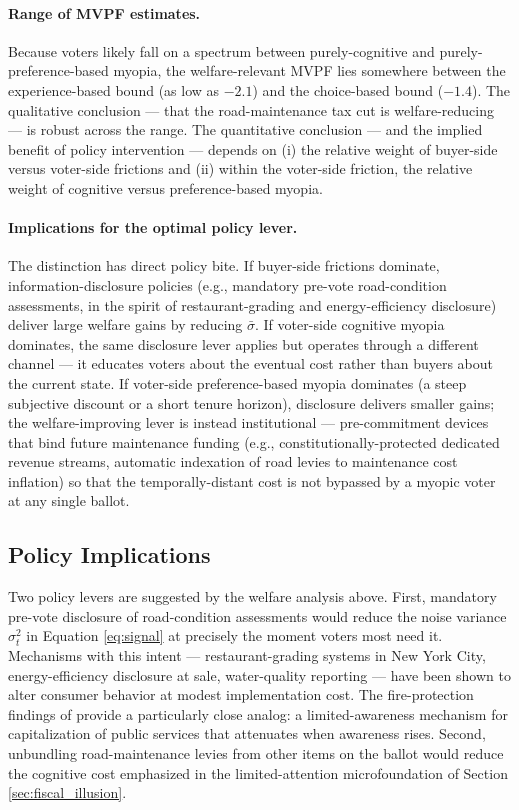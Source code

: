 \paragraph{Range of MVPF estimates.}
Because voters likely fall on a spectrum between purely-cognitive and purely-preference-based myopia, the welfare-relevant MVPF lies somewhere between the experience-based bound (as low as $-2.1$) and the choice-based bound ($-1.4$). The qualitative conclusion --- that the road-maintenance tax cut is welfare-reducing --- is robust across the range. The quantitative conclusion --- and the implied benefit of policy intervention --- depends on (i) the relative weight of buyer-side versus voter-side frictions and (ii) within the voter-side friction, the relative weight of cognitive versus preference-based myopia.

\paragraph{Implications for the optimal policy lever.}
The distinction has direct policy bite. If buyer-side frictions dominate, information-disclosure policies (e.g., mandatory pre-vote road-condition assessments, in the spirit of restaurant-grading and energy-efficiency disclosure) deliver large welfare gains by reducing $\bar{\sigma}$. If voter-side cognitive myopia dominates, the same disclosure lever applies but operates through a different channel --- it educates voters about the eventual cost rather than buyers about the current state. If voter-side preference-based myopia dominates (a steep subjective discount or a short tenure horizon), disclosure delivers smaller gains; the welfare-improving lever is instead institutional --- pre-commitment devices that bind future maintenance funding (e.g., constitutionally-protected dedicated revenue streams, automatic indexation of road levies to maintenance cost inflation) so that the temporally-distant cost is not bypassed by a myopic voter at any single ballot.

\subsection{Policy Implications}

Two policy levers are suggested by the welfare analysis above. First, mandatory pre-vote disclosure of road-condition assessments would reduce the noise variance $\sigma_t^2$ in Equation \ref{eq:signal} at precisely the moment voters most need it. Mechanisms with this intent --- restaurant-grading systems in New York City, energy-efficiency disclosure at sale, water-quality reporting --- have been shown to alter consumer behavior at modest implementation cost. The fire-protection findings of \citet{brasington2024fire} provide a particularly close analog: a limited-awareness mechanism for capitalization of public services that attenuates when awareness rises. Second, unbundling road-maintenance levies from other items on the ballot would reduce the cognitive cost emphasized in the limited-attention microfoundation of Section \ref{sec:fiscal_illusion}.

